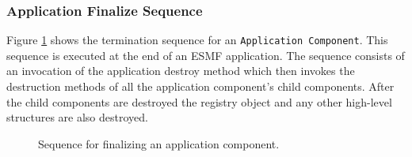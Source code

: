 \subsubsection{Application Finalize Sequence}

Figure \ref{fig:ApplicationFinalizeSequence} shows the termination sequence
for an {\tt Application Component}. This sequence is executed at
the end of an ESMF application. The sequence consists of an invocation
of the application destroy method which then invokes the destruction methods 
of all the application component's child components. After the child 
components are destroyed the registry object and any other high-level 
structures are also destroyed.

\begin{figure}
\caption[{Application Finalize}]{Sequence for finalizing an application
component.\\}
\begin{center}
\label{fig:ApplicationFinalizeSequence}
\end{center}
\end{figure}

